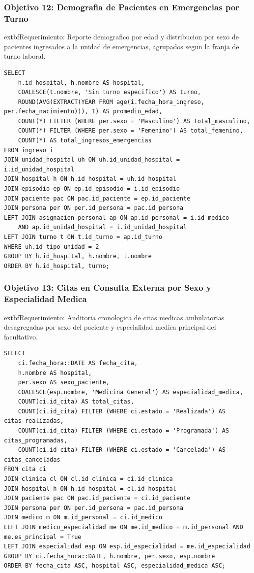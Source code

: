 \documentclass[11pt,a4paper]{article}
\begin{document}
\subsubsection{Objetivo 12: Demografia de Pacientes en Emergencias por Turno}
	extbf{Requerimiento:} Reporte demografico por edad y distribucion por sexo de pacientes ingresados a la unidad de emergencias, agrupados segun la franja de turno laboral.
\begin{lstlisting}[style=sqlstyle]
SELECT 
    h.id_hospital, h.nombre AS hospital,
    COALESCE(t.nombre, 'Sin turno especifico') AS turno,
    ROUND(AVG(EXTRACT(YEAR FROM age(i.fecha_hora_ingreso, per.fecha_nacimiento))), 1) AS promedio_edad,
    COUNT(*) FILTER (WHERE per.sexo = 'Masculino') AS total_masculino,
    COUNT(*) FILTER (WHERE per.sexo = 'Femenino') AS total_femenino,
    COUNT(*) AS total_ingresos_emergencias
FROM ingreso i
JOIN unidad_hospital uh ON uh.id_unidad_hospital = i.id_unidad_hospital
JOIN hospital h ON h.id_hospital = uh.id_hospital
JOIN episodio ep ON ep.id_episodio = i.id_episodio
JOIN paciente pac ON pac.id_paciente = ep.id_paciente
JOIN persona per ON per.id_persona = pac.id_persona
LEFT JOIN asignacion_personal ap ON ap.id_personal = i.id_medico 
    AND ap.id_unidad_hospital = i.id_unidad_hospital
LEFT JOIN turno t ON t.id_turno = ap.id_turno
WHERE uh.id_tipo_unidad = 2
GROUP BY h.id_hospital, h.nombre, t.nombre
ORDER BY h.id_hospital, turno;
\end{lstlisting}

\subsubsection{Objetivo 13: Citas en Consulta Externa por Sexo y Especialidad Medica}
	extbf{Requerimiento:} Auditoria cronologica de citas medicas ambulatorias desagregadas por sexo del paciente y especialidad medica principal del facultativo.
\begin{lstlisting}[style=sqlstyle]
SELECT 
    ci.fecha_hora::DATE AS fecha_cita,
    h.nombre AS hospital,
    per.sexo AS sexo_paciente,
    COALESCE(esp.nombre, 'Medicina General') AS especialidad_medica,
    COUNT(ci.id_cita) AS total_citas,
    COUNT(ci.id_cita) FILTER (WHERE ci.estado = 'Realizada') AS citas_realizadas,
    COUNT(ci.id_cita) FILTER (WHERE ci.estado = 'Programada') AS citas_programadas,
    COUNT(ci.id_cita) FILTER (WHERE ci.estado = 'Cancelada') AS citas_canceladas
FROM cita ci
JOIN clinica cl ON cl.id_clinica = ci.id_clinica
JOIN hospital h ON h.id_hospital = cl.id_hospital
JOIN paciente pac ON pac.id_paciente = ci.id_paciente
JOIN persona per ON per.id_persona = pac.id_persona
JOIN medico m ON m.id_personal = ci.id_medico
LEFT JOIN medico_especialidad me ON me.id_medico = m.id_personal AND me.es_principal = True
LEFT JOIN especialidad esp ON esp.id_especialidad = me.id_especialidad
GROUP BY ci.fecha_hora::DATE, h.nombre, per.sexo, esp.nombre
ORDER BY fecha_cita ASC, hospital ASC, especialidad_medica ASC;
\end{lstlisting}
\end{document}

